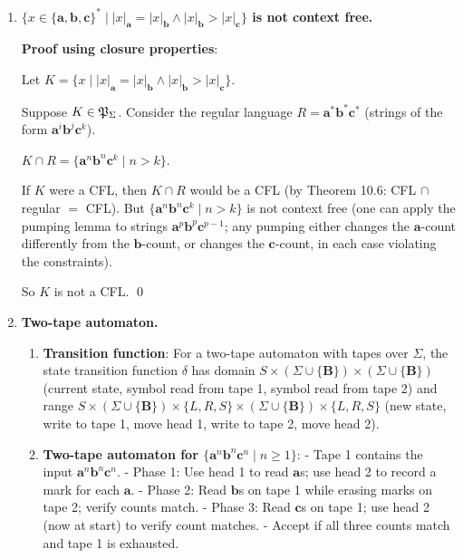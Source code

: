 \begin{enumerate}[{10.}1. ]
\item \textbf{$\{x\in\{\pmb{a},\pmb{b},\pmb{c}\}^* \mid |x|_{\pmb{a}}=|x|_{\pmb{b}}\wedge|x|_{\pmb{b}}>|x|_{\pmb{c}}\}$ is not context free.}

\textbf{Proof using closure properties}:

Let $K = \{x \mid |x|_{\pmb{a}}=|x|_{\pmb{b}}\wedge|x|_{\pmb{b}}>|x|_{\pmb{c}}\}$.

Suppose $K \in \mathfrak{P}_\Sigma$. Consider the regular language $R = \pmb{a}^*\pmb{b}^*\pmb{c}^*$ (strings of the form $\pmb{a}^i\pmb{b}^j\pmb{c}^k$).

$K \cap R = \{\pmb{a}^n\pmb{b}^n\pmb{c}^k \mid n>k\}$.

If $K$ were a CFL, then $K \cap R$ would be a CFL (by Theorem 10.6: CFL $\cap$ regular $=$ CFL). But $\{\pmb{a}^n\pmb{b}^n\pmb{c}^k \mid n>k\}$ is not context free (one can apply the pumping lemma to strings $\pmb{a}^p\pmb{b}^p\pmb{c}^{p-1}$; any pumping either changes the $\pmb{a}$-count differently from the $\pmb{b}$-count, or changes the $\pmb{c}$-count, in each case violating the constraints).

So $K$ is not a CFL. \qed

\item \textbf{Two-tape automaton.}

\begin{enumerate}
\item \textbf{Transition function}: For a two-tape automaton with tapes over $\Sigma$, the state transition function $\delta$ has domain $S \times (\Sigma\cup\{\pmb{B}\}) \times (\Sigma\cup\{\pmb{B}\})$ (current state, symbol read from tape 1, symbol read from tape 2) and range $S \times (\Sigma\cup\{\pmb{B}\}) \times \{L,R,S\} \times (\Sigma\cup\{\pmb{B}\}) \times \{L,R,S\}$ (new state, write to tape 1, move head 1, write to tape 2, move head 2).

\item \textbf{Two-tape automaton for $\{\pmb{a}^n\pmb{b}^n\pmb{c}^n \mid n\geq 1\}$}:
- Tape 1 contains the input $\pmb{a}^n\pmb{b}^n\pmb{c}^n$.
- Phase 1: Use head 1 to read $\pmb{a}$s; use head 2 to record a mark for each $\pmb{a}$.
- Phase 2: Read $\pmb{b}$s on tape 1 while erasing marks on tape 2; verify counts match.
- Phase 3: Read $\pmb{c}$s on tape 1; use head 2 (now at start) to verify count matches.
- Accept if all three counts match and tape 1 is exhausted.
\end{enumerate}


\end{enumerate}
